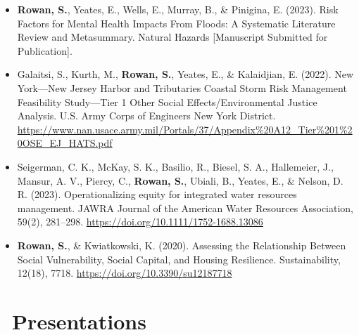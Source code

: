\documentclass[11pt,a4paper,]{sr-awesome-cv}
\begin{document}
\begin{itemize}
\item
  \textbf{Rowan, S.}, Yeates, E., Wells, E., Murray, B., \& Pinigina, E.
  (2023). Risk Factors for Mental Health Impacts From Floods: A
  Systematic Literature Review and Metasummary. Natural Hazards
  {[}Manuscript Submitted for Publication{]}.
\item
  Galaitsi, S., Kurth, M., \textbf{Rowan, S.}, Yeates, E., \&
  Kalaidjian, E. (2022). New York---New Jersey Harbor and Tributaries
  Coastal Storm Risk Management Feasibility Study---Tier 1 Other Social
  Effects/Environmental Justice Analysis. U.S. Army Corps of Engineers
  New York District.
  \url{https://www.nan.usace.army.mil/Portals/37/Appendix\%20A12_Tier\%201\%20OSE_EJ_HATS.pdf}
\item
  Seigerman, C. K., McKay, S. K., Basilio, R., Biesel, S. A.,
  Hallemeier, J., Mansur, A. V., Piercy, C., \textbf{Rowan, S.}, Ubiali,
  B., Yeates, E., \& Nelson, D. R. (2023). Operationalizing equity for
  integrated water resources management. JAWRA Journal of the American
  Water Resources Association, 59(2), 281--298.
  \url{https://doi.org/10.1111/1752-1688.13086}
\item
  \textbf{Rowan, S.}, \& Kwiatkowski, K. (2020). Assessing the
  Relationship Between Social Vulnerability, Social Capital, and Housing
  Resilience. Sustainability, 12(18), 7718.
  \url{https://doi.org/10.3390/su12187718}
\end{itemize}

\normalsize

\hypertarget{presentations}{%
\section{\faUser~Presentations}\label{presentations}}

\footnotesize
\end{document}
